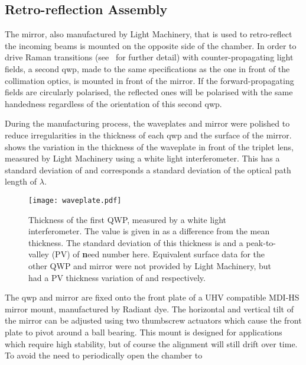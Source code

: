 \subsection{Retro-reflection Assembly}\label{subsec:setup_ramanmirror}
The mirror, also manufactured by Light Machinery, that is used to
retro-reflect the incoming beams is mounted on the opposite side of the
chamber. In order to drive Raman transitions
(see~ for further detail) with
counter-propagating light fields, a second \ac{qwp}, made to the same
specifications as the one in front of the collimation optics, is mounted in
front of the mirror. If the forward-propagating fields are circularly
polarised, the reflected ones will be polarised with the same handedness
regardless of the orientation of this second \ac{qwp}. \par\noindent
During the manufacturing process, the waveplates and mirror were polished to
reduce irregularities in the thickness of each \ac{qwp} and the surface of
the mirror.  shows the variation in the
thickness of the waveplate in front of the triplet lens, measured by Light
Machinery using a white light interferometer. This has a standard deviation
of  and corresponds a standard deviation of the
optical path length of \(\lambda\).
\begin{figure}
	\centering
	\texttt{[image: waveplate.pdf]}
	\caption{Thickness of the first \ac{QWP}, measured by a white light
		interferometer. The value is given in \sivalue{}{\nano\metre} as a difference
		from the mean thickness. The standard deviation of this thickness is
		 and a peak-to-valley (PV) of {\textbf need number
				here}. Equivalent surface data for the other \ac{QWP} and mirror were not
		provided by Light Machinery, but had a PV thickness variation of
		 and  respectively.}
	\label{fig:waveplate_map}
\end{figure}
\par\noindent
The \ac{qwp} and mirror are fixed onto the front plate of a UHV compatible
MDI-HS mirror mount, manufactured by Radiant dye. The horizontal and vertical
tilt of the mirror can be adjusted using two thumbscrew actuators which cause
the front plate to pivot around a ball bearing. This mount is designed for
applications which require high stability, but of course the alignment will
still drift over time. To avoid the need to periodically open the chamber to
